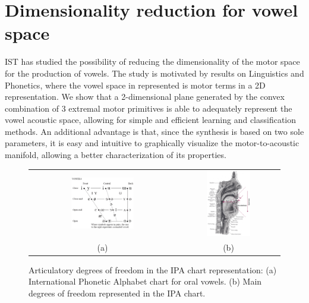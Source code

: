\section{Dimensionality reduction for vowel space}

\label{sect:vowel}

IST has studied the possibility of reducing the dimensionality of the
motor space for the production of vowels. The study is motivated by results on Linguistics and
Phonetics, where the vowel space in represented is motor terms in a 2D
representation. We show that a 2-dimensional plane generated by the
convex combination of 3 extremal motor primitives is able to
adequately represent the vowel acoustic space, allowing for simple and
efficient learning and classification methods. An additional advantage
is that, since the synthesis is based on two sole parameters, it is
easy and intuitive to graphically visualize the motor-to-acoustic
manifold, allowing a better characterization of its properties. 

\begin{figure}[!h]
  \centering
\begin{tabular}{cc}
\includegraphics[width=0.45\textwidth]{include/vowels/images/vowels} &
\includegraphics[width=0.45\textwidth]{include/vowels/images/vtdiag} \\
(a) & (b) \\
\end{tabular}
\caption{Articulatory degrees of freedom in the IPA chart
  representation: (a) International Phonetic Alphabet chart for oral
  vowels. (b) Main degrees of freedom represented in the IPA chart.}
\label{fig:ipavowels}
\end{figure}

